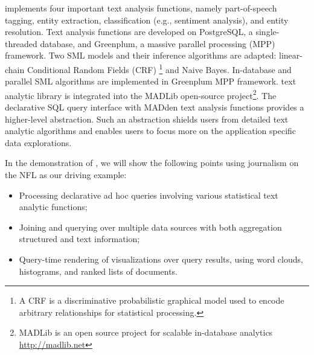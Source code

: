 {\system} implements four important text analysis functions, namely  
part-of-speech tagging, entity extraction, classification 
(e.g., sentiment analysis), and entity resolution.
Text analysis functions are developed on PostgreSQL, 
a single-threaded database, and Greenplum, a massive parallel 
processing (MPP) framework. 
Two SML models and their inference algorithms are adapted: linear-chain 
Conditional Random Fields (CRF)
\footnote{A CRF is a discriminative probabilistic graphical model used to encode
arbitrary relationships for statistical processing.} 
and Naive Bayes\cite{Wang:2008:BML:1453856.1453896}. 
In-database and parallel SML algorithms are implemented in Greenplum MPP framework.
{\system} text analytic library is integrated into the MADLib
open-source project\footnote{MADLib is an open source project for scalable in-database 
analytics \url{http://madlib.net}}.
The declarative SQL query interface with MADden text analysis functions 
provides a higher-level abstraction. Such an abstraction shields users from 
detailed text analytic algorithms and enables users to focus more on the 
application specific data explorations. 



In the demonstration of \system, we will show the 
following points using journalism on the NFL as our driving example:
\begin{itemize}[noitemsep]
\item Processing declarative ad hoc queries involving various statistical text analytic functions;
\item Joining and querying over multiple data sources with both aggregation structured and text information;
\item Query-time rendering of visualizations over query results, using 
word clouds, histograms, and ranked lists of documents.
\end{itemize}

